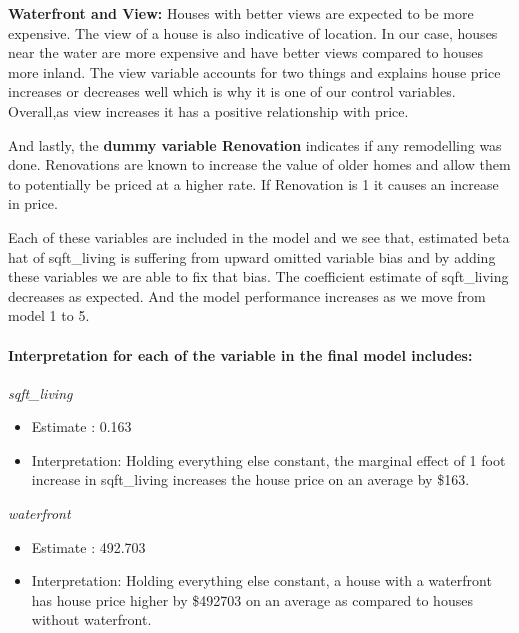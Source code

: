 \documentclass[
]{article}
\begin{document}
\textbf{Waterfront and View:} Houses with better views are expected to
be more expensive. The view of a house is also indicative of location.
In our case, houses near the water are more expensive and have better
views compared to houses more inland. The view variable accounts for two
things and explains house price increases or decreases well which is why
it is one of our control variables. Overall,as view increases it has a
positive relationship with price.

And lastly, the \textbf{dummy variable Renovation} indicates if any
remodelling was done. Renovations are known to increase the value of
older homes and allow them to potentially be priced at a higher rate. If
Renovation is 1 it causes an increase in price.

Each of these variables are included in the model and we see that,
estimated beta hat of sqft\_living is suffering from upward omitted
variable bias and by adding these variables we are able to fix that
bias. The coefficient estimate of sqft\_living decreases as expected.
And the model performance increases as we move from model 1 to 5.

\hypertarget{interpretation-for-each-of-the-variable-in-the-final-model-includes}{%
\paragraph{\texorpdfstring{\textbf{Interpretation for each of the
variable in the final model
includes:}}{Interpretation for each of the variable in the final model includes:}}\label{interpretation-for-each-of-the-variable-in-the-final-model-includes}}

\emph{sqft\_living}

\begin{itemize}
\item
  Estimate : 0.163
\item
  Interpretation: Holding everything else constant, the marginal effect
  of 1 foot increase in sqft\_living increases the house price on an
  average by \$163.
\end{itemize}

\emph{waterfront}

\begin{itemize}
\item
  Estimate : 492.703
\item
  Interpretation: Holding everything else constant, a house with a
  waterfront has house price higher by \$492703 on an average as
  compared to houses without waterfront.
\end{itemize}
\end{document}
